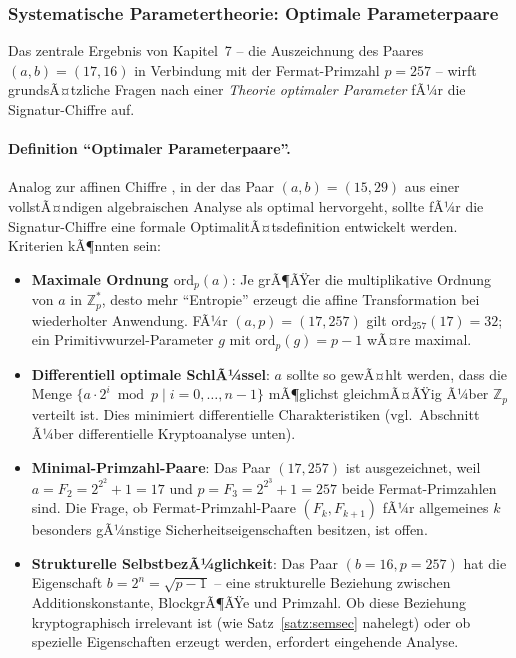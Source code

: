 ﻿\documentclass[a4paper,12pt]{scrreprt}
\theoremstyle{definition}
\begin{document}
\subsubsection{Systematische Parametertheorie: Optimale Parameterpaare}

Das zentrale Ergebnis von Kapitel~7 -- die Auszeichnung des Paares $(a, b) = (17, 16)$ in Verbindung mit der Fermat-Primzahl $p = 257$ -- wirft grundsÃ¤tzliche Fragen nach einer \emph{Theorie optimaler Parameter} fÃ¼r die Signatur-Chiffre auf.

\paragraph{Definition ``Optimaler Parameterpaare''.}
Analog zur affinen Chiffre \cite{Epp26c}, in der das Paar $(a,b) = (15, 29)$ aus einer vollstÃ¤ndigen algebraischen Analyse als optimal hervorgeht, sollte fÃ¼r die Signatur-Chiffre eine formale OptimalitÃ¤tsdefinition entwickelt werden. Kriterien kÃ¶nnten sein:
\begin{itemize}
  \item \textbf{Maximale Ordnung $\mathrm{ord}_p(a)$}: Je grÃ¶ÃŸer die multiplikative Ordnung von $a$ in $\mathbb{Z}_p^*$, desto mehr ``Entropie'' erzeugt die affine Transformation bei wiederholter Anwendung. FÃ¼r $(a,p) = (17, 257)$ gilt $\mathrm{ord}_{257}(17) = 32$; ein Primitivwurzel-Parameter $g$ mit $\mathrm{ord}_p(g) = p-1$ wÃ¤re maximal.
  \item \textbf{Differentiell optimale SchlÃ¼ssel}: $a$ sollte so gewÃ¤hlt werden, dass die Menge $\{a \cdot 2^i \bmod p \mid i = 0, \ldots, n-1\}$ mÃ¶glichst gleichmÃ¤ÃŸig Ã¼ber $\mathbb{Z}_p$ verteilt ist. Dies minimiert differentielle Charakteristiken (vgl.\ Abschnitt Ã¼ber differentielle Kryptoanalyse unten).
  \item \textbf{Minimal-Primzahl-Paare}: Das Paar $(17, 257)$ ist ausgezeichnet, weil $a = F_2 = 2^{2^2} + 1 = 17$ und $p = F_3 = 2^{2^3} + 1 = 257$ beide Fermat-Primzahlen sind. Die Frage, ob Fermat-Primzahl-Paare $(F_k, F_{k+1})$ fÃ¼r allgemeines $k$ besonders gÃ¼nstige Sicherheitseigenschaften besitzen, ist offen.
  \item \textbf{Strukturelle SelbstbezÃ¼glichkeit}: Das Paar $(b=16, p=257)$ hat die Eigenschaft $b = 2^n = \sqrt{p-1}$ -- eine strukturelle Beziehung zwischen Additionskonstante, BlockgrÃ¶ÃŸe und Primzahl. Ob diese Beziehung kryptographisch irrelevant ist (wie Satz~\ref{satz:semsec} nahelegt) oder ob spezielle Eigenschaften erzeugt werden, erfordert eingehende Analyse.
\end{itemize}
\end{document}
